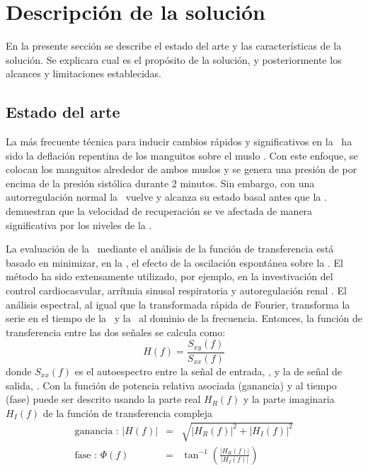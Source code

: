 \section{Descripción de la solución}
En la presente sección se describe el estado del arte y las características de la solución. Se explicara cual es el propósito de la solución, y posteriormente los alcances y limitaciones establecidas.

\subsection{Estado del arte}
La más frecuente técnica para inducir cambios rápidos y significativos en la \pam\, ha sido la deflación repentina de los manguitos sobre el muslo \citep{Aaslid1989, Aaslid1991,Lagi1994, Newell1994, Strebel1995, Tiecks1995a}. Con este enfoque, se colocan los manguitos alrededor de ambos muslos y se  genera una presión de  por encima de la presión sistólica durante 2 minutos. Sin embargo, con una autorregulación normal la \cbfv\, vuelve y alcanza su estado basal antes que la \pam. \cite{Aaslid1989} demuestran que la velocidad de recuperación se ve afectada de manera significativa por los niveles de la \pacoo.

La evaluación de la \ca\, mediante el análisis de la función de transferencia está basado en minimizar, en la \ca, el efecto de la oscilación espontánea sobre la \cbfv. El método ha sido extensamente utilizado, por ejemplo, en la investivación del control cardiocasvular, arrítmia sinusal respiratoria y autoregulación renal \citep{Saul1989, Saul1991, Holstein1991}. El análisis espectral, al igual que la transformada rápida de Fourier, transforma la serie en el tiempo de la \bp\, y la \cbfv\, al dominio de la frecuencia. Entonces, la función de transferencia entre las dos señales se calcula como: $$ H(f) = \frac{S_{xy}(f)}{S_{xx}(f)} $$ donde $S_{xx}(f)$ es el autoespectro entre la señal de entrada, \bp, y la de señal de salida, \cbfv \citep{Ainslie2008}. Con la función de potencia relativa asociada (ganancia) y al tiempo (fase) puede ser descrito usando la parte real $H_{R}(f)$ y la parte imaginaria $H_{I}(f)$ de la función de transferencia compleja
\begin{eqnarray}
    \mbox{ganancia : } |H(f)| &=& \sqrt{|H_{R}(f)|^2 + |H_{I}(f)|^2}\\
    \mbox{fase : } \Phi(f) &=& \tan^{-1}\left(\frac{|H_{R}(f)|}{|H_{I}(f)|}\right)
\end{eqnarray}

